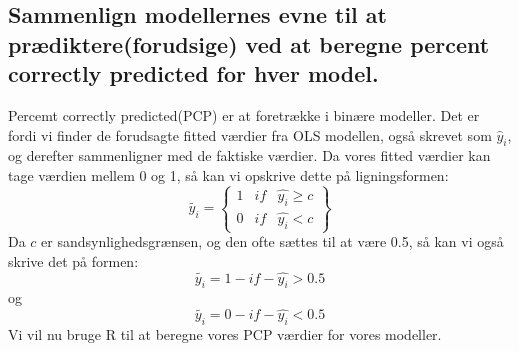 \documentclass[
  10pt,
]{article}
\newenvironment{Shaded}{\begin{snugshade}}{\end{snugshade}}
\newcommand{\CommentTok}[1]{\textcolor[rgb]{0.56,0.35,0.01}{\textit{#1}}}
\newcommand{\DecValTok}[1]{\textcolor[rgb]{0.00,0.00,0.81}{#1}}
\newcommand{\FloatTok}[1]{\textcolor[rgb]{0.00,0.00,0.81}{#1}}
\newcommand{\KeywordTok}[1]{\textcolor[rgb]{0.13,0.29,0.53}{\textbf{#1}}}
\newcommand{\NormalTok}[1]{#1}
\newcommand{\OperatorTok}[1]{\textcolor[rgb]{0.81,0.36,0.00}{\textbf{#1}}}
\newcommand{\StringTok}[1]{\textcolor[rgb]{0.31,0.60,0.02}{#1}}
\begin{document}
\hypertarget{sammenlign-modellernes-evne-til-at-pruxe6diktereforudsige-ved-at-beregne-percent-correctly-predicted-for-hver-model.}{%
\subsection{Sammenlign modellernes evne til at prædiktere(forudsige) ved
at beregne percent correctly predicted for hver
model.}\label{sammenlign-modellernes-evne-til-at-pruxe6diktereforudsige-ved-at-beregne-percent-correctly-predicted-for-hver-model.}}

Percemt correctly predicted(PCP) er at foretrække i binære modeller. Det
er fordi vi finder de forudsagte fitted værdier fra OLS modellen, også
skrevet som \(\hat{y}_i\), og derefter sammenligner med de faktiske
værdier. Da vores fitted værdier kan tage værdien mellem 0 og 1, så kan
vi opskrive dette på ligningsformen: \[\tilde{y_i} = \begin{Bmatrix}
1 &if  & \hat{y_i}\geq c\\
0 &if  & \hat{y_i}< c
\end{Bmatrix} \] Da \(c\) er sandsynlighedsgrænsen, og den ofte sættes
til at være 0.5, så kan vi også skrive det på formen:
\[ \tilde{y_i}=1-if-\hat{y_i}>0.5\] og
\[\tilde{y_i}=0-if-\hat{y_i}<0.5\] Vi vil nu bruge R til at beregne
vores PCP værdier for vores modeller.

\begin{Shaded}
\end{Shaded}
\end{document}
